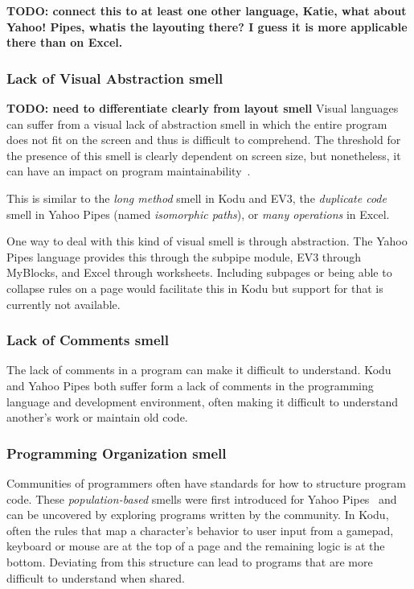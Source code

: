 \documentclass{sig-alternate}
\newcommand{\todo}[1]{\textbf{TODO: #1}}
\begin{document}
\todo{connect this to at least one other language, Katie, what about Yahoo! Pipes, whatis the layouting there? I guess it is more applicable there than on Excel.}


\subsubsection{Lack of Visual Abstraction smell}
\todo{need to differentiate clearly from layout smell}
Visual languages can suffer from a visual lack of abstraction smell in which the entire program does not fit on the screen and thus is difficult to comprehend. The threshold for the presence of this smell is clearly dependent on screen size, but nonetheless, it can have an impact on program maintainability~\cite{StoleeTSE2013}. 

This is similar to the \emph{long method} smell in Kodu and EV3, the \emph{duplicate code} smell in Yahoo Pipes (named \emph{isomorphic paths}), or \emph{many operations} in Excel.
	
One way to deal with this kind of visual smell is through abstraction. The Yahoo Pipes language provides this through the subpipe module, EV3 through MyBlocks, and Excel through worksheets.  Including subpages or being able to collapse rules on a page would facilitate this in Kodu but support for that is currently not available. 


\subsubsection{Lack of Comments smell}
The lack of comments in a program can make it difficult to understand. Kodu and Yahoo Pipes both suffer form a lack of comments in the programming language and development environment, often making it difficult to understand another's work or maintain old code. 


\subsubsection{Programming Organization smell}
Communities of programmers often have standards for how to structure program code. These \emph{population-based} smells were first introduced for Yahoo Pipes~\cite{StoleeTSE2013} and can be uncovered by exploring programs written by the community. In Kodu, often the rules that map a character's behavior to user input from a gamepad, keyboard or mouse are at the top of a page and the remaining logic is at the bottom. Deviating from this structure can lead to programs that are more difficult to understand when shared. 
\end{document}
